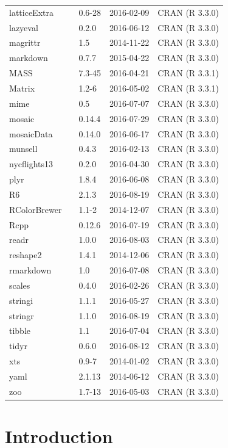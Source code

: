 \documentclass[]{tufte-book}
\begin{document}
\begin{longtable}{lllll}
latticeExtra &  & 0.6-28 & 2016-02-09 & CRAN (R 3.3.0)\\
lazyeval &  & 0.2.0 & 2016-06-12 & CRAN (R 3.3.0)\\
magrittr &  & 1.5 & 2014-11-22 & CRAN (R 3.3.0)\\
\addlinespace
markdown &  & 0.7.7 & 2015-04-22 & CRAN (R 3.3.0)\\
MASS &  & 7.3-45 & 2016-04-21 & CRAN (R 3.3.1)\\
Matrix &  & 1.2-6 & 2016-05-02 & CRAN (R 3.3.1)\\
mime &  & 0.5 & 2016-07-07 & CRAN (R 3.3.0)\\
mosaic &  & 0.14.4 & 2016-07-29 & CRAN (R 3.3.0)\\
\addlinespace
mosaicData &  & 0.14.0 & 2016-06-17 & CRAN (R 3.3.0)\\
munsell &  & 0.4.3 & 2016-02-13 & CRAN (R 3.3.0)\\
nycflights13 &  & 0.2.0 & 2016-04-30 & CRAN (R 3.3.0)\\
plyr &  & 1.8.4 & 2016-06-08 & CRAN (R 3.3.0)\\
R6 &  & 2.1.3 & 2016-08-19 & CRAN (R 3.3.0)\\
\addlinespace
RColorBrewer &  & 1.1-2 & 2014-12-07 & CRAN (R 3.3.0)\\
Rcpp &  & 0.12.6 & 2016-07-19 & CRAN (R 3.3.0)\\
readr &  & 1.0.0 & 2016-08-03 & CRAN (R 3.3.0)\\
reshape2 &  & 1.4.1 & 2014-12-06 & CRAN (R 3.3.0)\\
rmarkdown &  & 1.0 & 2016-07-08 & CRAN (R 3.3.0)\\
\addlinespace
scales &  & 0.4.0 & 2016-02-26 & CRAN (R 3.3.0)\\
stringi &  & 1.1.1 & 2016-05-27 & CRAN (R 3.3.0)\\
stringr &  & 1.1.0 & 2016-08-19 & CRAN (R 3.3.0)\\
tibble &  & 1.1 & 2016-07-04 & CRAN (R 3.3.0)\\
tidyr &  & 0.6.0 & 2016-08-12 & CRAN (R 3.3.0)\\
\addlinespace
xts &  & 0.9-7 & 2014-01-02 & CRAN (R 3.3.0)\\
yaml &  & 2.1.13 & 2014-06-12 & CRAN (R 3.3.0)\\
zoo &  & 1.7-13 & 2016-05-03 & CRAN (R 3.3.0)\\
\bottomrule
\end{longtable}

\chapter{Introduction}\label{intro}
\end{document}
